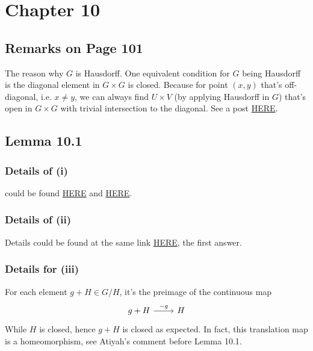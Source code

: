 \section{Chapter 10}

\subsection{Remarks on Page 101}

The reason why $G$ is Hausdorff. 
One equivalent condition for $G$ being Hausdorff is the diagonal element in $G\times G$ is closed. 
Because for point $(x,y)$ that's off-diagonal, i.e. $x\neq y$, we can always find $U\times V$ (by applying Hausdorff in $G$) that's open in $G\times G$ with trivial intersection to the diagonal. See a post \href{https://math.stackexchange.com/questions/136922/x-is-hausdorff-if-and-only-if-the-diagonal-of-x-times-x-is-closed}{HERE}.

\subsection{Lemma 10.1}

\subsubsection{Details of (i)}
could be found \href{https://math.stackexchange.com/questions/13368/intersection-of-neighborhoods-of-0-subgroup}{HERE} and \href{https://math.stackexchange.com/questions/174955/intersection-of-all-neighborhoods-of-zero-is-a-subgroup}{HERE}.

\subsubsection{Details of (ii)}
Details could be found at the same link \href{https://math.stackexchange.com/questions/174955/intersection-of-all-neighborhoods-of-zero-is-a-subgroup}{HERE}, the first answer.

\subsubsection{Details for (iii)}
For each element $g+H\in G/H$, it's the preimage of the continuous map
\[\begin{tikzcd}
	{g+H} & H
	\arrow["{-g}", from=1-1, to=1-2]
\end{tikzcd}\] While $H$ is closed, hence $g+H$ is closed as expected. In fact, this translation map is a homeomorphism, see Atiyah's comment before Lemma 10.1.

